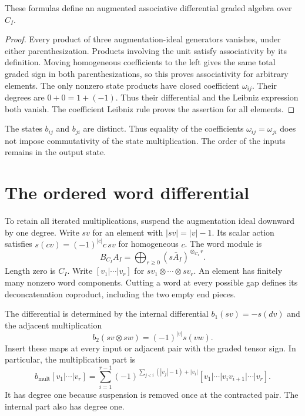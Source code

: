 \begin{proposition}\label{prop:ocb-coefficient-algebra}
These formulas define an augmented associative differential graded
algebra over $C_I$.
\end{proposition}

\begin{proof}
Every product of three augmentation-ideal generators vanishes,
under either parenthesization.
Products involving the unit satisfy associativity by its definition.
Moving homogeneous coefficients to the left gives the same total
graded sign in both parenthesizations, so this proves associativity
for arbitrary elements.
The only nonzero state products have closed coefficient $\omega_{ij}$.
Their degrees are $0+0=1+(-1)$.
Thus their differential and the Leibniz expression both vanish.
The coefficient Leibniz rule proves the assertion for all elements.
\end{proof}

The states $b_{ij}$ and $b_{ji}$ are distinct.
Thus equality of the coefficients $\omega_{ij}=\omega_{ji}$ does
not impose commutativity of the state multiplication.
The order of the inputs remains in the output state.

\section{The ordered word differential}

To retain all iterated multiplications, suspend the augmentation
ideal downward by one degree.
Write $sv$ for an element with $|sv|=|v|-1$.
Its scalar action satisfies
$s(cv)=(-1)^{|c|}c\,sv$ for homogeneous $c$.
The word module is
\[
 B_{C_I}A_I=\bigoplus_{r\ge0}(s\bar A_I)^{\otimes_{C_I}r}.
\]
Length zero is $C_I$.
Write $[v_1|\cdots|v_r]$ for
$sv_1\otimes\cdots\otimes sv_r$.
An element has finitely many nonzero word components.
Cutting a word at every possible gap defines its deconcatenation
coproduct, including the two empty end pieces.

The differential is determined by the internal differential
$b_1(sv)=-s(dv)$ and the adjacent multiplication
\[
 b_2(sv\otimes sw)=(-1)^{|v|}s(vw).
\]
Insert these maps at every input or adjacent pair with the graded
tensor sign. In particular, the multiplication part is
\begin{equation}\label{eq:ocb-bar-faces}
 b_{\mathrm{mult}}[v_1|\cdots|v_r]
 =\sum_{i=1}^{r-1}
 (-1)^{\sum_{j<i}(|v_j|-1)+|v_i|}
 [v_1|\cdots|v_iv_{i+1}|\cdots|v_r].
\end{equation}
It has degree one because suspension is removed once at the
contracted pair. The internal part also has degree one.

